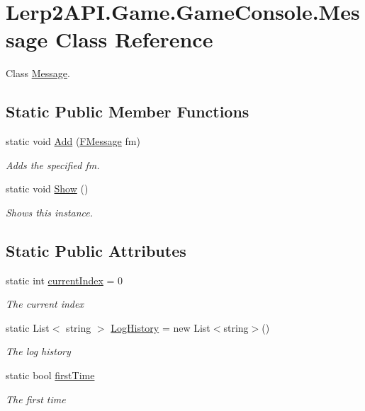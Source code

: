 \hypertarget{class_lerp2_a_p_i_1_1_game_1_1_game_console_1_1_message}{}\section{Lerp2\+A\+P\+I.\+Game.\+Game\+Console.\+Message Class Reference}
\label{class_lerp2_a_p_i_1_1_game_1_1_game_console_1_1_message}


Class \hyperlink{class_lerp2_a_p_i_1_1_game_1_1_game_console_1_1_message}{Message}.  


\subsection*{Static Public Member Functions}
\begin{DoxyCompactItemize}
\item 
static void \hyperlink{class_lerp2_a_p_i_1_1_game_1_1_game_console_1_1_message_a2a7b3e173df5c61ddaac7760382edabf}{Add} (\hyperlink{class_lerp2_a_p_i_1_1_game_1_1_game_console_1_1_f_message}{F\+Message} fm)
\begin{DoxyCompactList}\small\item\em Adds the specified fm. \end{DoxyCompactList}\item 
static void \hyperlink{class_lerp2_a_p_i_1_1_game_1_1_game_console_1_1_message_af469f65ee48d9fb78b53729a0a04390a}{Show} ()
\begin{DoxyCompactList}\small\item\em Shows this instance. \end{DoxyCompactList}\end{DoxyCompactItemize}
\subsection*{Static Public Attributes}
\begin{DoxyCompactItemize}
\item 
static int \hyperlink{class_lerp2_a_p_i_1_1_game_1_1_game_console_1_1_message_aacac1c5592a278341ce198dddd0ab8cb}{current\+Index} = 0
\begin{DoxyCompactList}\small\item\em The current index \end{DoxyCompactList}\item 
static List$<$ string $>$ \hyperlink{class_lerp2_a_p_i_1_1_game_1_1_game_console_1_1_message_acdd82e95ed96665f7f331f9ec05f045b}{Log\+History} = new List$<$string$>$()
\begin{DoxyCompactList}\small\item\em The log history \end{DoxyCompactList}\item 
static bool \hyperlink{class_lerp2_a_p_i_1_1_game_1_1_game_console_1_1_message_a9602f4fb5c962a386cfc74de6449035b}{first\+Time}
\begin{DoxyCompactList}\small\item\em The first time \end{DoxyCompactList}\end{DoxyCompactItemize}


